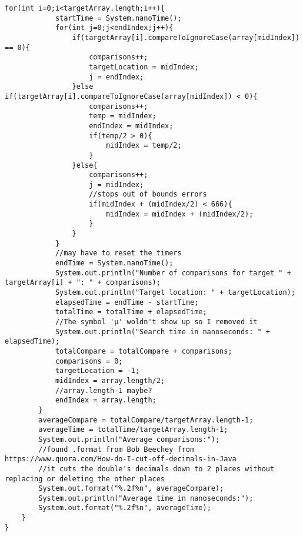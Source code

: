 \documentclass[10pt]{article}
\begin{document}
\begin{lstlisting}[frame=single, ]
        for(int i=0;i<targetArray.length;i++){
            startTime = System.nanoTime();
            for(int j=0;j<endIndex;j++){
                if(targetArray[i].compareToIgnoreCase(array[midIndex]) == 0){
                    comparisons++;
                    targetLocation = midIndex;
                    j = endIndex;
                }else if(targetArray[i].compareToIgnoreCase(array[midIndex]) < 0){
                    comparisons++;
                    temp = midIndex;
                    endIndex = midIndex;
                    if(temp/2 > 0){
                        midIndex = temp/2;
                    }
                }else{
                    comparisons++;
                    j = midIndex;
                    //stops out of bounds errors
                    if(midIndex + (midIndex/2) < 666){
                        midIndex = midIndex + (midIndex/2);
                    }
                }
            }
            //may have to reset the timers
            endTime = System.nanoTime();
            System.out.println("Number of comparisons for target " + targetArray[i] + ": " + comparisons);
            System.out.println("Target location: " + targetLocation);
            elapsedTime = endTime - startTime;
            totalTime = totalTime + elapsedTime;
            //The symbol 'μ' woldn't show up so I removed it
            System.out.println("Search time in nanoseconds: " + elapsedTime);
            totalCompare = totalCompare + comparisons;
            comparisons = 0;
            targetLocation = -1;
            midIndex = array.length/2;
            //array.length-1 maybe?
            endIndex = array.length;
        }
        averageCompare = totalCompare/targetArray.length-1;
        averageTime = totalTime/targetArray.length-1;
        System.out.println("Average comparisons:");
        //found .format from Bob Beechey from https://www.quora.com/How-do-I-cut-off-decimals-in-Java
        //it cuts the double's decimals down to 2 places without replacing or deleting the other places
        System.out.format("%.2f%n", averageCompare);
        System.out.println("Average time in nanoseconds:");
        System.out.format("%.2f%n", averageTime);
    }
}
\end{lstlisting}
\end{document}
